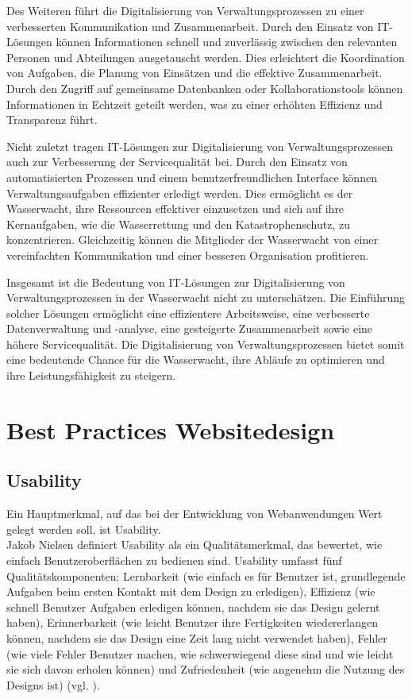 \documentclass[fontsize=12pt,openright,oneside,paper=a4,BCOR=1cm]{scrbook}
\begin{document}
Des Weiteren führt die Digitalisierung von Verwaltungsprozessen zu einer verbesserten Kommunikation und Zusammenarbeit. Durch den Einsatz von IT-Lösungen können Informationen schnell und zuverlässig zwischen den relevanten Personen und Abteilungen ausgetauscht werden. Dies erleichtert die Koordination von Aufgaben, die Planung von Einsätzen und die effektive Zusammenarbeit. Durch den Zugriff auf gemeinsame Datenbanken oder Kollaborationstools können Informationen in Echtzeit geteilt werden, was zu einer erhöhten Effizienz und Transparenz führt.

Nicht zuletzt tragen IT-Lösungen zur Digitalisierung von Verwaltungsprozessen auch zur Verbesserung der Servicequalität bei. Durch den Einsatz von automatisierten Prozessen und einem benutzerfreundlichen Interface können Verwaltungsaufgaben effizienter erledigt werden. Dies ermöglicht es der Wasserwacht, ihre Ressourcen effektiver einzusetzen und sich auf ihre Kernaufgaben, wie die Wasserrettung und den Katastrophenschutz, zu konzentrieren. Gleichzeitig können die Mitglieder der Wasserwacht von einer vereinfachten Kommunikation und einer besseren Organisation profitieren.

Insgesamt ist die Bedeutung von IT-Lösungen zur Digitalisierung von Verwaltungsprozessen in der Wasserwacht nicht zu unterschätzen. Die Einführung solcher Lösungen ermöglicht eine effizientere Arbeitsweise, eine verbesserte Datenverwaltung und -analyse, eine gesteigerte Zusammenarbeit sowie eine höhere Servicequalität. Die Digitalisierung von Verwaltungsprozessen bietet somit eine bedeutende Chance für die Wasserwacht, ihre Abläufe zu optimieren und ihre Leistungsfähigkeit zu steigern.

\section{Best Practices Websitedesign}

\subsection{Usability}
Ein Hauptmerkmal, auf das bei der Entwicklung von Webanwendungen Wert gelegt werden soll, ist Usability. \\
Jakob Nielsen definiert Usability als ein Qualitätsmerkmal, das bewertet, wie einfach Benutzeroberflächen zu bedienen sind. Usability umfasst fünf Qualitätskomponenten: Lernbarkeit (wie einfach es für Benutzer ist, grundlegende Aufgaben beim ersten Kontakt mit dem Design zu erledigen), Effizienz (wie schnell Benutzer Aufgaben erledigen können, nachdem sie das Design gelernt haben), Erinnerbarkeit (wie leicht Benutzer ihre Fertigkeiten wiedererlangen können, nachdem sie das Design eine Zeit lang nicht verwendet haben), Fehler (wie viele Fehler Benutzer machen, wie schwerwiegend diese sind und wie leicht sie sich davon erholen können) und Zufriedenheit (wie angenehm die Nutzung des Designs ist) (vgl. \cite{nielsen}). \\
\end{document}
